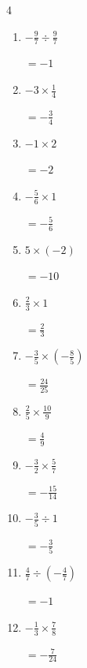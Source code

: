\begin{multicols}{4}
\begin{enumerate}
        $\displaystyle =\frac{10}{7}$

  \item $\displaystyle -\frac{9}{7}\div{}\frac{9}{7}$

        $\displaystyle =-1$

  \item $\displaystyle -3\times{}\frac{1}{4}$

        $\displaystyle =-\frac{3}{4}$

  \item $\displaystyle -1\times{}2$

        $\displaystyle =-2$

\columnbreak %

  \item $\displaystyle -\frac{5}{6}\times{}1$

        $\displaystyle =-\frac{5}{6}$

  \item $\displaystyle 5\times{}\left(-2\right)$

        $\displaystyle =-10$

  \item $\displaystyle \frac{2}{3}\times{}1$

        $\displaystyle =\frac{2}{3}$

  \item $\displaystyle -\frac{3}{5}\times{}\left(-\frac{8}{5}\right)$

        $\displaystyle =\frac{24}{25}$

  \item $\displaystyle \frac{2}{5}\times{}\frac{10}{9}$

        $\displaystyle =\frac{4}{9}$

  \item $\displaystyle -\frac{3}{2}\times{}\frac{5}{7}$

        $\displaystyle =-\frac{15}{14}$

  \item $\displaystyle -\frac{3}{5}\div{}1$

        $\displaystyle =-\frac{3}{5}$

  \item $\displaystyle \frac{4}{7}\div{}\left(-\frac{4}{7}\right)$

        $\displaystyle =-1$

  \item $\displaystyle -\frac{1}{3}\times{}\frac{7}{8}$

        $\displaystyle =-\frac{7}{24}$


\end{enumerate}
\end{multicols}
